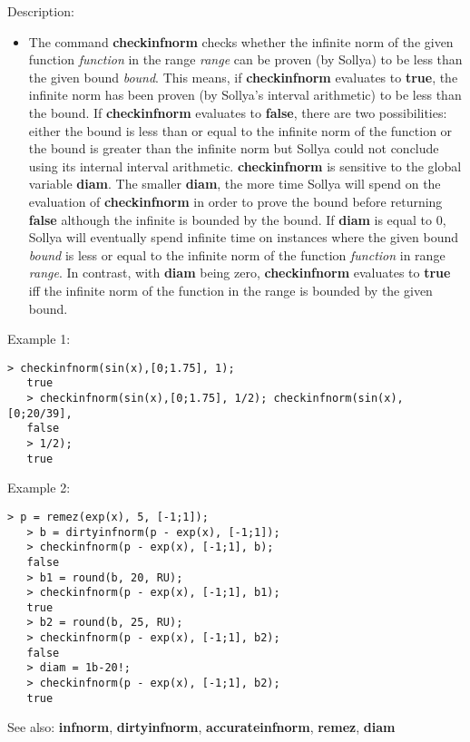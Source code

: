 \noindent Description: \begin{itemize}

\item The command \textbf{checkinfnorm} checks whether the infinite norm of the given
   function \emph{function} in the range \emph{range} can be proven (by Sollya) to
   be less than the given bound \emph{bound}. This means, if \textbf{checkinfnorm}
   evaluates to \textbf{true}, the infinite norm has been proven (by Sollya's
   interval arithmetic) to be less than the bound. If \textbf{checkinfnorm} evaluates
   to \textbf{false}, there are two possibilities: either the bound is less than
   or equal to the infinite norm of the function or the bound is greater
   than the infinite norm but Sollya could not conclude using its
   internal interval arithmetic.
   \textbf{checkinfnorm} is sensitive to the global variable \textbf{diam}. The smaller \textbf{diam},
   the more time Sollya will spend on the evaluation of \textbf{checkinfnorm} in
   order to prove the bound before returning \textbf{false} although the infinite
   is bounded by the bound. If \textbf{diam} is equal to $0$, Sollya will
   eventually spend infinite time on instances where the given bound
   \emph{bound} is less or equal to the infinite norm of the function
   \emph{function} in range \emph{range}. In contrast, with \textbf{diam} being zero,
   \textbf{checkinfnorm} evaluates to \textbf{true} iff the infinite norm of the function in
   the range is bounded by the given bound.
\end{itemize}
\noindent Example 1: 
\begin{center}\begin{minipage}{14.8cm}\begin{Verbatim}[frame=single]
   > checkinfnorm(sin(x),[0;1.75], 1);
   true
   > checkinfnorm(sin(x),[0;1.75], 1/2); checkinfnorm(sin(x),[0;20/39],
   false
   > 1/2);
   true
\end{Verbatim}
\end{minipage}\end{center}
\noindent Example 2: 
\begin{center}\begin{minipage}{14.8cm}\begin{Verbatim}[frame=single]
   > p = remez(exp(x), 5, [-1;1]);
   > b = dirtyinfnorm(p - exp(x), [-1;1]);
   > checkinfnorm(p - exp(x), [-1;1], b);
   false
   > b1 = round(b, 20, RU);
   > checkinfnorm(p - exp(x), [-1;1], b1);
   true
   > b2 = round(b, 25, RU);
   > checkinfnorm(p - exp(x), [-1;1], b2);
   false
   > diam = 1b-20!;
   > checkinfnorm(p - exp(x), [-1;1], b2);
   true
\end{Verbatim}
\end{minipage}\end{center}
See also: \textbf{infnorm}, \textbf{dirtyinfnorm}, \textbf{accurateinfnorm}, \textbf{remez}, \textbf{diam}
